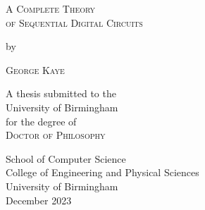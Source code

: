 \begin{titlepage}
\begin{center}

  \large %

  {\Huge\textsc{A Complete Theory\\of Sequential Digital Circuits}\par}


  by


  {\huge\textsc{George Kaye}}


  A thesis submitted to the \\
  University of Birmingham \\
  for the degree of \\
  \textsc{Doctor of Philosophy}

  \vfill

  \flushright
  School of Computer Science \\
  College of Engineering and Physical Sciences \\
  University of Birmingham \\
  December 2023

\end{center}
\end{titlepage}